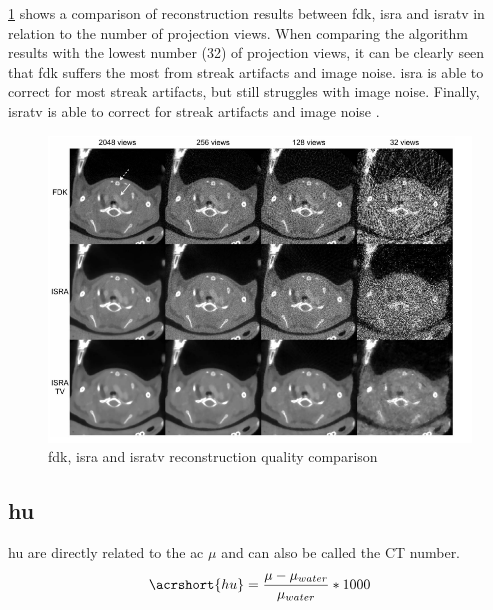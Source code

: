 \noindent
\cref{fig:alg-comp} shows a comparison of reconstruction results between \gls{fdk}, \gls{isra} and \gls{isratv}
in relation to the number of projection views.
When comparing the algorithm results with the lowest number (32) of projection views,
it can be clearly seen that \gls{fdk} suffers the most from streak artifacts and image noise.
\gls{isra} is able to correct for most streak artifacts, but still struggles with image noise.
Finally, \gls{isratv} is able to correct for streak artifacts and image noise \cite{vandeghinsteLowDoseMicroCTImaging2013}.
\begin{figure}[h]
	\centerline{
		\includegraphics[scale=0.5]{images/alg-comp.png}}
	\caption{\gls{fdk}, \gls{isra} and \gls{isratv} reconstruction quality comparison \cite{vandeghinsteLowDoseMicroCTImaging2013}}\label{fig:alg-comp}
\end{figure}


\subsection{\acrfull{hu}}\label{s:b-hu}
\acrfull{hu} are directly related to the \acrfull{ac} $\mu$
and can also be called the CT number.
\begin{equation}
	\acrshort{hu} = \frac{\mu - \mu_{water}}{\mu_{water}}*1000
\end{equation}\label{eqn:hu}

